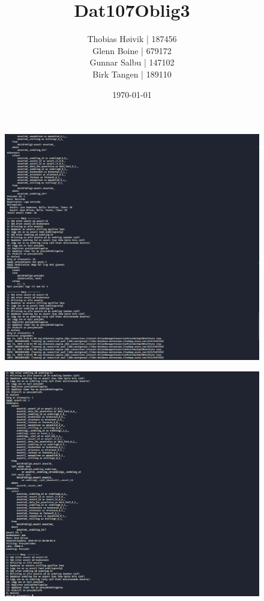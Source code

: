 \documentclass[12pt]{article}
\title{Dat107Oblig3}
\author{Thobias Høivik | 187456 \\ 
        Glenn Boine | 679172 \\
        Gunnar Salbu | 147102 \\ 
        Birk Tangen | 189110
}
\date{\today}
\begin{document}
\maketitle
\begin{figure}[ht]
    \centering
    \includegraphics[width=1\textwidth]{./img/Running1.PNG}
\end{figure}
\begin{figure}[ht]
    \centering
    \includegraphics[width=1\textwidth]{./img/Running2.PNG}
\end{figure}
\end{document}
